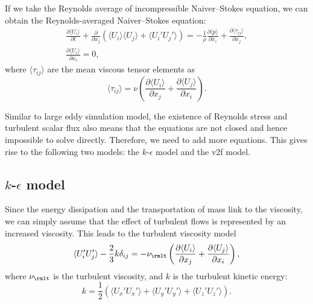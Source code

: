 \documentclass[english, nochinese]{pkupaper}
\begin{document}
If we take the Reynolds average of incompressible Naiver--Stokes equation, we can obtain the Reynolds-averaged Naiver--Stokes equation:
\begin{gather}
\frac{\partial\langle U_i\rangle}{\partial t} + \frac{\partial}{\partial x_j}\left(\langle U_i\rangle\langle U_j\rangle + \langle U_i'U_j'\rangle\right) = - \frac{1}{\rho} \frac{\partial\langle p\rangle}{\partial x_i} + \frac{\partial\langle\tau_{ij}\rangle}{\partial x_j}, \\
\frac{\partial\langle U_i\rangle}{\partial x_i} = 0,
\end{gather}
where $\langle\tau_{ij}\rangle$ are the mean viscous tensor elements as
\begin{equation}
\langle\tau_{ij}\rangle = \nu\left(\frac{\partial\langle U_i\rangle}{\partial x_j} + \frac{\partial\langle U_j\rangle}{\partial x_i}\right).
\end{equation}

Similar to large eddy simulation model, the existence of Reynolds stress and turbulent scalar flux also means that the equations are not closed and hence impossible to solve directly. Therefore, we need to add more equations. This gives rise to the following two models: the $k$-$\epsilon$ model and the v2f model.

\subsection{$k$-$\epsilon$ model}

Since the energy dissipation and the transportation of mass link to the viscosity, we can simply assume that the effect of turbulent flows is represented by an increased viscosity. This leads to the turbulent viscosity model
\begin{equation}
\langle U_i'U_j'\rangle - \frac{2}{3} k \delta_{ij} = -\nu_{\rmlt}\left(\frac{\partial\langle U_i\rangle}{\partial x_j} + \frac{\partial\langle U_j\rangle}{\partial x_i}\right),
\end{equation}
where $\nu_{\rmlt}$ is the turbulent viscosity, and $k$ is the turbulent kinetic energy:
\begin{equation}
k = \frac{1}{2}(\langle U_x'U_x'\rangle + \langle U_y'U_y'\rangle + \langle U_z'U_z'\rangle).
\end{equation}
\end{document}
